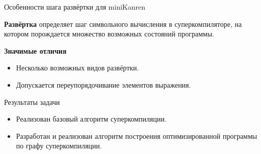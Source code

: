 \documentclass[xcolor=table]{beamer}
\begin{document}
\begin{frame}{Особенности шага развёртки для miniKanren}
\begin{block}{}
{\bf Развёртка} определяет шаг символьного вычисления в суперкомпиляторе,
на котором порождается множество возможных состояний программы.
\end{block}
\vspace{0.5cm}
\begin{block}
{\bf Значимые отличия}
\begin{itemize}
\item Несколько возможных видов развёртки.
\item Допускается переупорядочивание элементов выражения.
\end{itemize}
\end{block}
\end{frame}

\begin{frame}{Результаты задачи}
\begin{itemize}
\item Реализован базовый алгоритм суперкомпиляции.
\item Разработан и реализован алгоритм построения оптимизированной программы по графу суперкомпиляции.
\end{itemize}
\end{frame}
\end{document}
